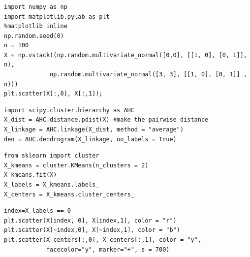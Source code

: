 \begin{frame}[fragile]\frametitle{}
\tiny	
\begin{lstlisting}
import numpy as np
import matplotlib.pylab as plt
%matplotlib inline
np.random.seed(0)
n = 100
X = np.vstack((np.random.multivariate_normal([0,0], [[1, 0], [0, 1]], n), 
             np.random.multivariate_normal([3, 3], [[1, 0], [0, 1]] , n)))
plt.scatter(X[:,0], X[:,1]);
\end{lstlisting} 

\begin{lstlisting}
import scipy.cluster.hierarchy as AHC
X_dist = AHC.distance.pdist(X) #make the pairwise distance
X_linkage = AHC.linkage(X_dist, method = "average")
den = AHC.dendrogram(X_linkage, no_labels = True)
\end{lstlisting} 

\begin{lstlisting}
from sklearn import cluster
X_kmeans = cluster.KMeans(n_clusters = 2)
X_kmeans.fit(X)
X_labels = X_kmeans.labels_
X_centers = X_kmeans.cluster_centers_
\end{lstlisting} 

\begin{lstlisting}
index=X_labels == 0 
plt.scatter(X[index, 0], X[index,1], color = "r")
plt.scatter(X[~index,0], X[~index,1], color = "b")
plt.scatter(X_centers[:,0], X_centers[:,1], color = "y", 
            facecolor="y", marker="+", s = 700)
\end{lstlisting} 
\end{frame}









%
%
%
%


